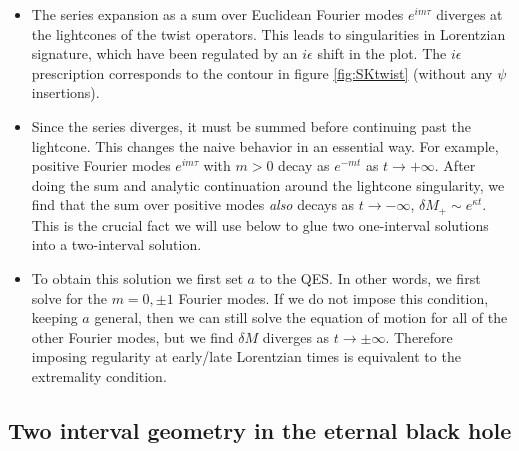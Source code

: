 \documentclass[11pt,oneside,letterpaper]{article}
\numberwithin{equation}{section}
\begin{document}
\begin{spacing}{1.1}
\begin{itemize}

\item   The series expansion as a sum over Euclidean Fourier modes $e^{i m \tau}$ diverges at the lightcones of the twist operators. This leads to singularities in Lorentzian signature, which have been regulated by an $i\epsilon$ shift in the plot. The $i\epsilon$ prescription corresponds to the contour in figure \ref{fig:SKtwist} (without any $\psi$ insertions).

\item Since the series diverges, it must be summed before continuing past the lightcone. This changes the naive behavior in an essential way. For example, positive Fourier modes $e^{i m \tau}$ with $m>0$ decay as $e^{-mt}$ as $t \to +\infty$. After doing the sum and analytic continuation around the lightcone singularity, we find that the sum over positive modes \textit{also} decays as $t \to -\infty$, $\delta M_+ \sim e^{\kappa t}$. This is the crucial fact we will use below to glue two one-interval solutions into a two-interval solution.

\item To obtain this solution we first set $a$ to the QES. In other words, we first solve for the $m=0,\pm 1$ Fourier modes. If we do not impose this condition, keeping $a$ general, then we can still solve the equation of motion for all of the other Fourier modes, but we find $\delta M$ diverges as $t \to \pm \infty$. Therefore imposing regularity at early/late Lorentzian times is equivalent to the extremality condition.



\end{itemize}  
  




 \subsection{Two interval geometry in the eternal black hole}
 

\end{spacing}
\end{document}
